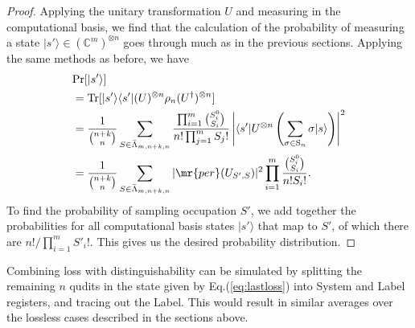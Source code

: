 \begin{proof}
Applying the unitary transformation $U$ and measuring in the computational basis, we find that the calculation of the probability of measuring a state $|s'\rangle \in (\mathbb{C}^m)^{\otimes n}$ goes through much as in the previous sections.
Applying the same methods as before, we have
\begin{align}
&\textrm{Pr}[|s'\rangle]\\
&= \textrm{Tr}[|s'\rangle\langle s'|(U)^{\otimes n}\rho_n (U^\dagger)^{\otimes n}]\\
&= \frac{1}{\binom{n+k}{n}}\sum_{S \in \bar{\Lambda}_{m,n+k,n}} \frac{\prod_{i=1}^m \binom{S_i^0}{S_i}}{n!\prod_{j=1}^m S_j!} \left|\langle s'|U^{\otimes n}\left(\sum_{\sigma \in \textrm{S}_n}\sigma|s\rangle\right)\right|^2\\
&= \frac{1}{\binom{n+k}{n}}\sum_{S \in \bar{\Lambda}_{m,n+k,n}} |\mr{per}(U_{S',S})|^2 \prod_{i=1}^m \frac{\binom{S_i^0}{S_i}}{n!S_i!} .
\end{align}
To find the probability of sampling occupation $S'$, we add together the probabilities for all computational basis states $|s'\rangle$ that map to $S'$, of which there are $n!/\prod_{i=1}^m S'_i!$. 
This gives us the desired probability distribution.
\end{proof}

Combining loss with distinguishability can be simulated by splitting the remaining $n$ qudits in the state given by Eq.(\ref{eq:lastloss}) into System and Label registers, and tracing out the Label.
This would result in similar averages over the lossless cases described in the sections above.



